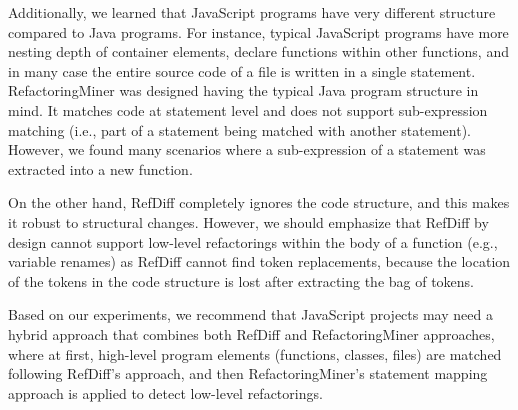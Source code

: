 \documentclass[letterpaper,12pt,onecolumn,final]{report}
\begin{document}
Additionally, we learned that JavaScript programs have very different structure compared to Java programs.
For instance, typical JavaScript programs have more nesting depth of container elements, declare functions within other functions, and in many case the entire source code of a file is written in a single statement.
RefactoringMiner was designed having the typical Java program structure in mind.
It matches code at statement level and does not support sub-expression matching (i.e., part of a statement being matched with another statement).
However, we found many scenarios where a sub-expression of a statement was extracted into a new function.

On the other hand, RefDiff completely ignores the code structure, and this makes it robust to structural changes. However, we should emphasize that RefDiff by design cannot support low-level refactorings within the body of a function (e.g., variable renames) as RefDiff cannot find token replacements, because the location of the tokens in the code structure is lost after extracting the bag of tokens.

Based on our experiments, we recommend that JavaScript projects may need a hybrid approach that combines both RefDiff and RefactoringMiner approaches, where at first, high-level program elements (functions, classes, files) are matched following RefDiff's approach, and then RefactoringMiner's statement mapping approach is applied to detect low-level refactorings.

\clearpage
{}
{}  %
\singlespacing %





\appendix
\setcounter{table}{0}		%
\setcounter{figure}{0}		%
\renewcommand{\thefigure}{\Alph{chapter}.\arabic{figure}} 	%
\renewcommand{\thetable}{\Alph{chapter}.\arabic{table}}		%

\begin{appendices}
\doublespacing
\end{appendices}
\end{document}
